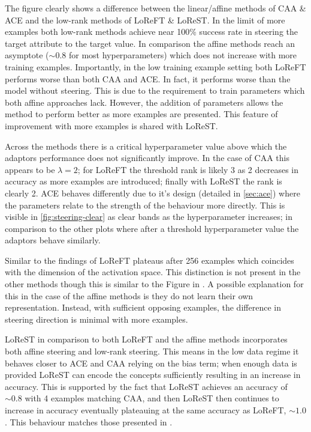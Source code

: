 The figure clearly shows a difference between the linear/affine methods of CAA \& ACE and the low-rank methods of LoReFT \& LoReST.
In the limit of more examples both low-rank methods achieve near 100\% success rate in steering the target attribute to the target value.
In comparison the affine methods reach an asymptote ($\sim 0.8$ for most hyperparameters) which does not increase with more training examples.
Importantly, in the low training example setting both LoReFT performs worse than both CAA and ACE.
In fact, it performs worse than the model without steering.
This is due to the requirement to train parameters which both affine approaches lack.
However, the addition of parameters allows the method to perform better as more examples are presented.
This feature of improvement with more examples is shared with LoReST.

Across the methods there is a critical hyperparameter value above which the adaptors performance does not significantly improve.
In the case of CAA this appears to be $\lambda=2$; for LoReFT the threshold rank is likely 3 as 2 decreases in accuracy as more examples are introduced; finally with LoReST the rank is clearly 2.
ACE behaves differently due to it's design (detailed in \cref{sec:ace}) where the parameters relate to the strength of the behaviour more directly.
This is visible in \cref{fig:steering-clear} as clear bands as the hyperparameter increases; in comparison to the other plots where after a threshold hyperparameter value the adaptors behave similarly.

Similar to the findings of \citet{steering-clear} LoReFT plateaus after 256 examples which coincides with the dimension of the activation space.
This distinction is not present in the other methods though this is similar to the Figure in \citet{steering-clear}.
A possible explanation for this in the case of the affine methods is they do not learn their own representation.
Instead, with sufficient opposing examples, the difference in steering direction is minimal with more examples.

LoReST in comparison to both LoReFT and the affine methods incorporates both affine steering and low-rank steering.
This means in the low data regime it behaves closer to ACE and CAA relying on the bias term; when enough data is provided LoReST can encode the concepts sufficiently resulting in an increase in accuracy.
This is supported by the fact that LoReST achieves an accuracy of $\sim 0.8$ with 4 examples matching CAA, and then LoReST then continues to increase in accuracy eventually plateauing at the same accuracy as LoReFT, $\sim 1.0$.
This behaviour matches those presented in \citet{steering-clear}.

